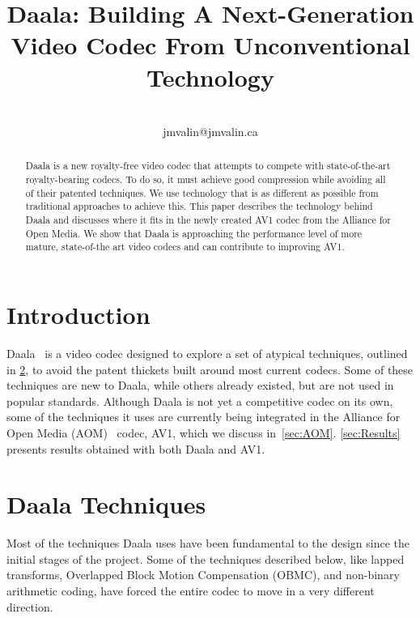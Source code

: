 \documentclass[english,conference,10pt]{IEEEtran}
\begin{document}
\title{Daala: Building A Next-Generation Video Codec From Unconventional
Technology}


\author{\\
jmvalin@jmvalin.ca
}
\maketitle
\begin{abstract}
Daala is a new royalty-free video codec that attempts to compete with
 state-of-the-art royalty-bearing codecs.
To do so, it must achieve good compression while avoiding all of their
 patented techniques.
We use technology that is as different as possible from traditional
 approaches to achieve this.
This paper describes the technology behind Daala and discusses where it fits in
 the newly created AV1 codec from the Alliance for Open Media.
We show that Daala is approaching the performance level of more mature,
 state-of-the art video codecs and can contribute to improving AV1.
\end{abstract}

\section{Introduction}

Daala~\cite{DaalaWebsite} is a video codec designed to explore a set of
 atypical techniques, outlined in \cref{sec:techniques}, to avoid the patent
 thickets built around most current codecs.
Some of these techniques are new to Daala, while others already existed, but
are not used in popular standards. Although Daala is not yet
a competitive codec on its own, some of the techniques it uses are
currently being integrated in the Alliance for Open Media 
(AOM)~\cite{AOMWebsite} codec, AV1, which we discuss in~\cref{sec:AOM}.
\cref{sec:Results} presents results obtained with both Daala and AV1.

\section{Daala Techniques}
\label{sec:techniques}

Most of the techniques Daala uses have been fundamental to the design since the
initial stages of the project. Some of the techniques described below, like
lapped transforms, Overlapped Block Motion Compensation (OBMC), and non-binary
arithmetic coding, have forced the entire codec to move in a very
different direction.
\end{document}
